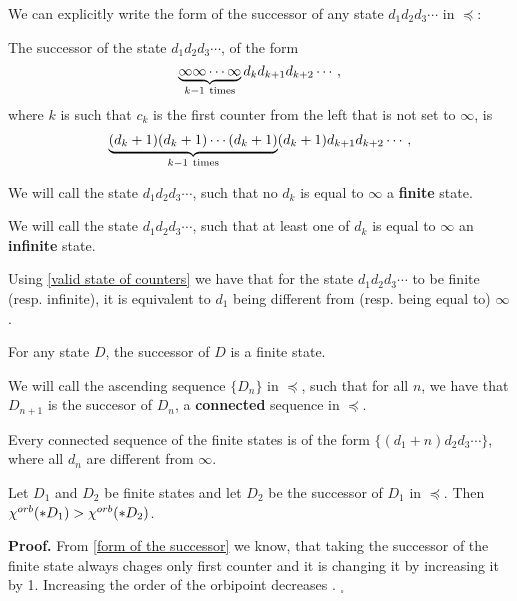 We can explicitly write the form of the successor of any state $d_1d_2d_3\cdots$ in $\preceq$:
\begin{observation}\label{form of the successor}
The successor of 
the state $d_1d_2d_3\cdots$, of the form
\begin{equation}
\underbrace{\infty\infty\cdots\infty}_{k-1 \rm\ times} d_kd_{k+1}d_{k+2}\cdots,
\end{equation}
where $k$ is 
such that $c_k$ is the first counter 
from the left that is not set to $\infty$,
is
\begin{equation} 
\underbrace{(d_k+1)(d_k+1)\cdots(d_k+1)}_{k-1\rm\ times}(d_k+1)d_{k+1}d_{k+2}\cdots,
\end{equation}

\end{observation}
\begin{definition}
We will call the state $d_1d_2d_3\cdots$, such that no $d_k$ is equal to $\infty$ a 
\textbf{finite} state. 

We will call the state $d_1d_2d_3\cdots$, such that at least one of $d_k$ is equal to $\infty$ 
an \textbf{infinite} state.  
\end{definition}
\begin{observation}
Using \ref{valid state of counters} we have that 
for the state $d_1d_2d_3\cdots$ to be finite (resp. infinite), it is equivalent to 
$d_1$ being different from (resp. being equal to) $\infty$. 
\end{observation}

\begin{observation}\label{finiteness of the successor}
For any state $D$, the successor of $D$ is a finite state.
\end{observation}
\begin{definition}
We will call the ascending sequence $\{D_n\}$ 
in $\preceq$, such 
that for all $n$, we have that $D_{n+1}$ is the succesor of $D_n$, a \textbf{connected} sequence in 
$\preceq$.   
\end{definition}
\begin{observation}
Every connected sequence of the finite states is of the form $\{(d_1+n)d_2d_3\cdots\}$, 
where all $d_n$ are different from $\infty$.
\end{observation}
\begin{observation}\label{Successor lemma}
Let $D_1$ and $D_2$ be finite states and let $D_2$ be the successor of $D_1$ in 
$\preceq$. Then ${\chi^{orb}(*D_1)} > {\chi^{orb}(*D_2)}$.
\end{observation}
\textbf{Proof.}
From \ref{form of the successor} we know, that taking the successor 
of the finite state always chages  
only first counter and it is changing it by increasing it by 1. 
Increasing the order of the orbipoint  
decreases \Eoc. $_\square$

